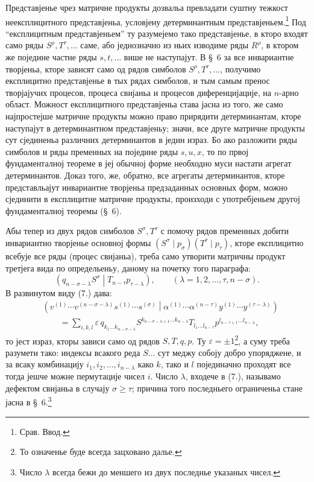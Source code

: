\documentclass[11pt]{article}
\newcommand{\pair}[2]{\left(#1\middle|#2\right)}
\newcommand{\eps}{\varepsilon}
\begin{document}
Представјенье чрез матричне продукты дозвальа превладати суштну тежкост неексплицитного представјеньа, условјену детерминантным представјеньем.\footnote{Срав. Ввод.} Под ``експлицитным представјеньем'' ту разумејемо тако представјенье, в кторо входят само ряды $S^\rho,T^\tau,\ldots$ саме, або једнозначно из ньих изводиме ряды $R^\rho$, в ктором же поједине частне ряды $s,t,\ldots$ више не наступајут. В \S\ 6 за все инвариантне творјеньа, кторе зависят само од рядов симболов $S^\rho,T^\tau,\ldots$, получимо експлицитно представјенье в тых рядах симболов, и тым самым пренос творјајучих процесов, процеса свијаньа и процесов диференцијације, на $n$-арно област. Можност експлицитного представјеньа става јасна из того, же само најпростејше матричне продукты можно право прирядити детерминантам, кторе наступајут в детерминантном представјеньу; значи, все друге матричне продукты сут сјединеньа различних детерминантов в једин израз. Бо ако разложити ряды симболов и ряды пременных на поједине ряды $s,u,x$, то по првој фундаменталној теореме в јеј обычној форме необходно муси настати агрегат детерминантов. Доказ того, же, обратно, все агрегаты детерминантов, кторе представльајут инвариантне творјеньа предзаданных основных форм, можно сјединити в експлицитне матричне продукты, произходи с употребјеньем другој фундаменталној теоремы (\S\ 6).

Абы тепер из двух рядов симболов $S^\sigma,T^\tau$ с помочу рядов пременных добити инвариантно творјенье основној формы $(S^\sigma\mid p_\sigma)(T^\tau\mid p_\tau)$, кторе експлицитно всебује все ряды (процес свијаньа), треба само утворити матричны продукт третјега вида по определьеньу, даному на почетку того параграфа:
\begin{equation}
 \pair{q_{n-\sigma-\lambda}S^\sigma}{T_{n-\tau}p_{\tau-\lambda}},
 \qquad (\lambda=1,2,\ldots,\tau,n-\sigma).
\tag{7}
\end{equation}
В развинутом виду (7.) дава:
\begin{equation}
\begin{aligned}
&\pair{v^{(1)}\cdots v^{(n-\sigma-\lambda)}s^{(1)}\cdots s^{(\sigma)}}
       {\alpha^{(1)}\cdots\alpha^{(n-\tau)}y^{(1)}\cdots y^{(\tau-\lambda)}} \\
&\qquad =\sum_{i,k,l}\eps\,q_{k_1\ldots k_{n-\sigma-\lambda}}
 S^{k_{n-\sigma-\lambda+1}\ldots k_{n-\lambda}}
 T_{l_1\ldots l_{n-\tau}}
 p^{l_{n-\tau+1}\ldots l_{n-\lambda}},
\end{aligned}
\tag{8}
\end{equation}
то јест израз, кторы зависи само од рядов $S,T,q,p$. Ту $\eps=\pm1$\footnote{То означенье буде всегда зацховано далье.}, а суму треба разумети тако: индексы всакого реда $S\ldots$ сут меджу собоју добро упоряджене, и за всаку комбинацију $i_1,i_2,\ldots,i_{n-\lambda}$ како $k$, тако и $l$ појединачно проходят все тогда јешче можне пермутације чисел $i$. Число $\lambda$, входече в (7.), называмо дефектом свијаньа в случају $\sigma\geq\tau$; причина того последньего ограниченьа стане јасна в \S\ 6.\footnote{Число $\lambda$ всегда бежи до меншего из двух последнье указаных чисел.}
\end{document}
